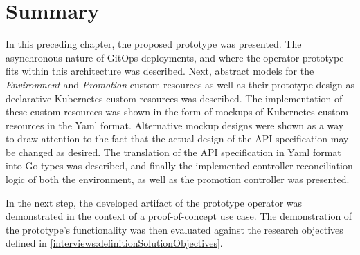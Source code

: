 \section{Summary}

In this preceding chapter,
the proposed prototype was presented.
The asynchronous nature of GitOps deployments, and where
the operator prototype fits within this architecture was described.
Next, abstract models for the \textit{Environment} and \textit{Promotion} custom resources as well as their prototype
design as declarative Kubernetes custom resources was described.
The implementation of these custom resources was shown in the form of mockups
of Kubernetes custom resources in the Yaml format.
Alternative mockup designs were shown as a way to draw attention to the fact
that the actual design of the API specification may be changed as desired.
The translation of the API specification in Yaml format into Go types was described,
and finally the implemented controller reconciliation logic of both the environment, as well as
the promotion controller was presented.

In the next step, the developed artifact of the prototype operator was
demonstrated in the context of a proof-of-concept use case.
The demonstration of the prototype's functionality was then evaluated against
the research objectives defined in
\ref{interviews:definitionSolutionObjectives}.














